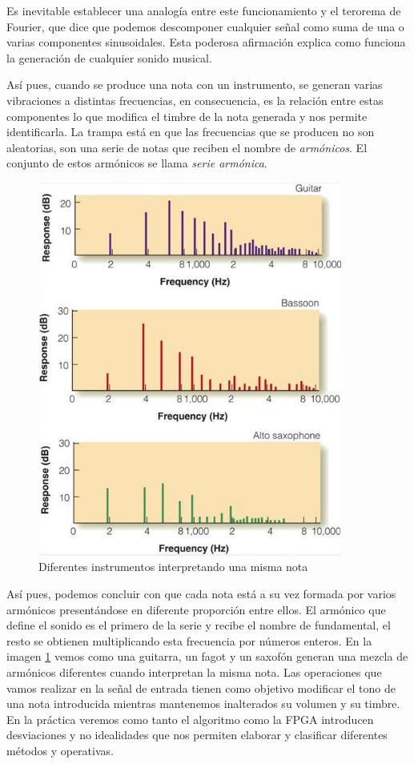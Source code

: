 Es inevitable establecer una analogía entre este funcionamiento y el terorema de Fourier, que dice que podemos descomponer cualquier señal como suma de una o varias componentes sinusoidales. Esta poderosa afirmación explica como funciona la generación de cualquier sonido musical.

Así pues, cuando se produce una nota con un instrumento, se generan varias vibraciones a distintas frecuencias, en consecuencia, es la relación entre estas componentes lo que modifica el timbre de la nota generada y nos permite identificarla. La trampa está en que las frecuencias que se producen no son aleatorias, son una serie de notas que reciben el nombre de \emph{armónicos}. El conjunto de estos armónicos se llama \emph{serie armónica}.

\begin{figure}[!ht]
\begin{center}
\includegraphics[width=10cm]{img/armonicos.jpg}
\caption{\label{fig:armonicos}Diferentes instrumentos interpretando una misma nota}
\end{center}
\end{figure}


Así pues, podemos concluir con que cada nota está a su vez formada por varios armónicos presentándose en diferente proporción entre ellos. El armónico que define el sonido es el primero de la serie y recibe el nombre de fundamental, el resto se obtienen multiplicando esta frecuencia por números enteros. En la imagen \ref{fig:armonicos} vemos como una guitarra, un fagot y un saxofón generan una mezcla de armónicos diferentes cuando interpretan la misma nota. Las operaciones que vamos realizar en la señal de entrada tienen como objetivo modificar el tono de una nota introducida mientras mantenemos inalterados su volumen y su timbre. En la práctica veremos como tanto el algoritmo como la FPGA introducen desviaciones y no idealidades que nos permiten elaborar y clasificar diferentes métodos y operativas.